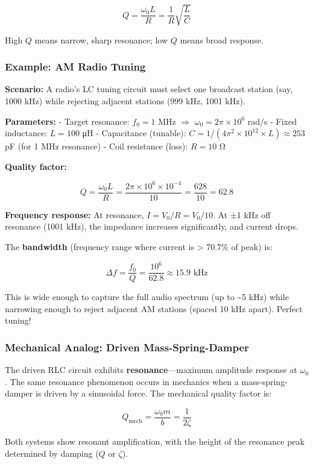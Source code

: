 \documentclass[
]{article}
\begin{document}
\[Q = \frac{\omega_0 L}{R} = \frac{1}{R}\sqrt{\frac{L}{C}}\]

High \(Q\) means narrow, sharp resonance; low \(Q\) means broad
response.

\subsubsection{Example: AM Radio Tuning}\label{example-am-radio-tuning}

\textbf{Scenario:} A radio's LC tuning circuit must select one broadcast
station (say, 1000 kHz) while rejecting adjacent stations (999 kHz, 1001
kHz).

\textbf{Parameters:} - Target resonance: \(f_0 = 1\) MHz \(\Rightarrow\)
\(\omega_0 = 2\pi \times 10^6\) rad/s - Fixed inductance: \(L = 100\) μH
- Capacitance (tunable):
\(C = 1/(4\pi^2 \times 10^{12} \times L) \approx 253\) pF (for 1 MHz
resonance) - Coil resistance (loss): \(R = 10\) Ω

\textbf{Quality factor:}

\[Q = \frac{\omega_0 L}{R} = \frac{2\pi \times 10^6 \times 10^{-4}}{10} = \frac{628}{10} = 62.8\]

\textbf{Frequency response:} At resonance, \(I = V_0/R = V_0/10\). At ±1
kHz off resonance (1001 kHz), the impedance increases significantly, and
current drops.

The \textbf{bandwidth} (frequency range where current is \textgreater{}
70.7\% of peak) is:

\[\Delta f = \frac{f_0}{Q} = \frac{10^6}{62.8} \approx 15.9 \text{ kHz}\]

This is wide enough to capture the full audio spectrum (up to
\textasciitilde5 kHz) while narrowing enough to reject adjacent AM
stations (spaced 10 kHz apart). Perfect tuning!

\subsubsection{Mechanical Analog: Driven
Mass-Spring-Damper}\label{mechanical-analog-driven-mass-spring-damper}

The driven RLC circuit exhibits \textbf{resonance}---maximum amplitude
response at \(\omega_0\). The same resonance phenomenon occurs in
mechanics when a mass-spring-damper is driven by a sinusoidal force. The
mechanical quality factor is:

\[Q_{\text{mech}} = \frac{\omega_0 m}{b} = \frac{1}{2\zeta}\]

Both systems show resonant amplification, with the height of the
resonance peak determined by damping (\(Q\) or \(\zeta\)).
\end{document}
